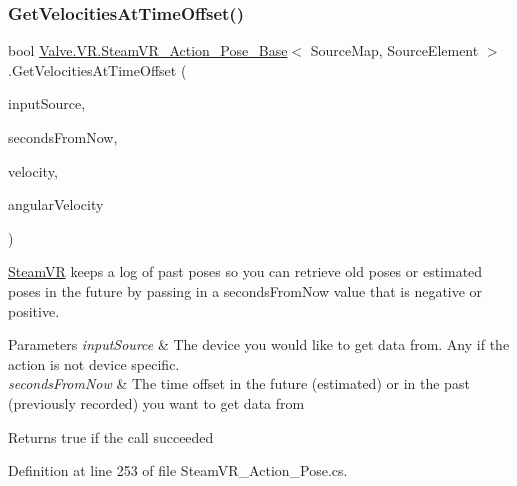 \subsubsection{\texorpdfstring{GetVelocitiesAtTimeOffset()}{GetVelocitiesAtTimeOffset()}}
{\footnotesize\ttfamily bool \mbox{\hyperlink{class_valve_1_1_v_r_1_1_steam_v_r___action___pose___base}{Valve.\+V\+R.\+Steam\+V\+R\+\_\+\+Action\+\_\+\+Pose\+\_\+\+Base}}$<$ Source\+Map, Source\+Element $>$.Get\+Velocities\+At\+Time\+Offset (\begin{DoxyParamCaption}\item[{\mbox{\hyperlink{namespace_valve_1_1_v_r_a82e5bf501cc3aa155444ee3f0662853f}{Steam\+V\+R\+\_\+\+Input\+\_\+\+Sources}}}]{input\+Source,  }\item[{float}]{seconds\+From\+Now,  }\item[{out Vector3}]{velocity,  }\item[{out Vector3}]{angular\+Velocity }\end{DoxyParamCaption})}



\mbox{\hyperlink{class_valve_1_1_v_r_1_1_steam_v_r}{Steam\+VR}} keeps a log of past poses so you can retrieve old poses or estimated poses in the future by passing in a seconds\+From\+Now value that is negative or positive. 


\begin{DoxyParams}{Parameters}
{\em input\+Source} & The device you would like to get data from. Any if the action is not device specific.\\
\hline
{\em seconds\+From\+Now} & The time offset in the future (estimated) or in the past (previously recorded) you want to get data from\\
\hline
\end{DoxyParams}
\begin{DoxyReturn}{Returns}
true if the call succeeded
\end{DoxyReturn}


Definition at line 253 of file Steam\+V\+R\+\_\+\+Action\+\_\+\+Pose.\+cs.

\mbox{\label{class_valve_1_1_v_r_1_1_steam_v_r___action___pose___base_a827a230f97d4cb064be1b679440a3593}} 
